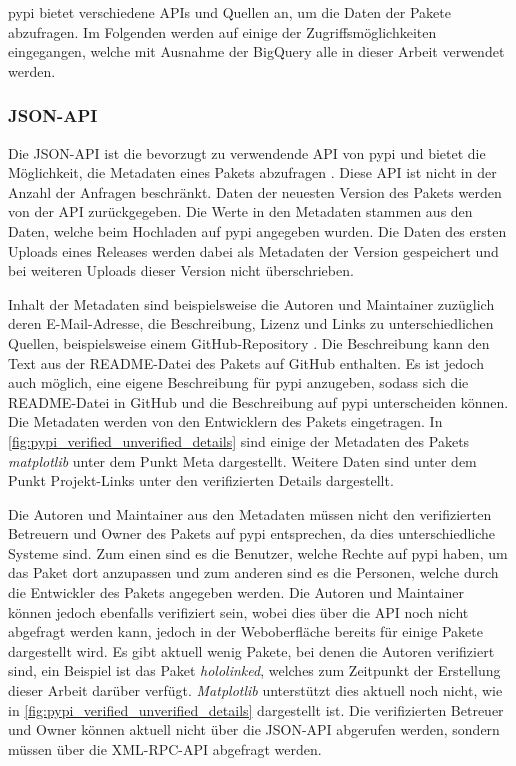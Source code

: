 \gls{pypi} bietet verschiedene APIs und Quellen an, um die Daten der Pakete abzufragen.
Im Folgenden werden auf einige der Zugriffsmöglichkeiten eingegangen, welche mit Ausnahme der BigQuery alle in dieser Arbeit verwendet werden.

\subsubsection*{JSON-API}
\label{subsubsec:pypi_json_api}
Die JSON-API ist die bevorzugt zu verwendende API von \gls{pypi} und bietet die Möglichkeit, die Metadaten eines Pakets abzufragen \autocite{python_software_foundation_warehouse_2024}.
Diese API ist nicht in der Anzahl der Anfragen beschränkt.
Daten der neuesten Version des Pakets werden von der API zurückgegeben.
Die Werte in den Metadaten stammen aus den Daten, welche beim Hochladen auf \gls{pypi} angegeben wurden.
Die Daten des ersten Uploads eines Releases werden dabei als Metadaten der Version gespeichert und bei weiteren Uploads dieser Version nicht überschrieben.

Inhalt der Metadaten sind beispielsweise die Autoren und Maintainer zuzüglich deren E-Mail-Adresse, die Beschreibung, Lizenz und Links zu unterschiedlichen Quellen, beispielsweise einem GitHub-Repository \autocite{python_software_foundation_warehouse_2024}.
Die Beschreibung kann den Text aus der README-Datei des Pakets auf GitHub enthalten.
Es ist jedoch auch möglich, eine eigene Beschreibung für \gls{pypi} anzugeben, sodass sich die README-Datei in GitHub und die Beschreibung auf \gls{pypi} unterscheiden können.
Die Metadaten werden von den Entwicklern des Pakets eingetragen.
In \autoref{fig:pypi_verified_unverified_details} sind einige der Metadaten des Pakets \emph{matplotlib} unter dem Punkt \glqq Meta\grqq{} dargestellt.
Weitere Daten sind unter dem Punkt \glqq Projekt-Links\grqq{} unter den verifizierten Details dargestellt.

Die Autoren und Maintainer aus den Metadaten müssen nicht den verifizierten Betreuern und Owner des Pakets auf \gls{pypi} entsprechen, da dies unterschiedliche Systeme sind.
Zum einen sind es die Benutzer, welche Rechte auf \gls{pypi} haben, um das Paket dort anzupassen und zum anderen sind es die Personen, welche durch die Entwickler des Pakets angegeben werden.
Die Autoren und Maintainer können jedoch ebenfalls verifiziert sein, wobei dies über die API noch nicht abgefragt werden kann, jedoch in der Weboberfläche bereits für einige Pakete dargestellt wird.
Es gibt aktuell wenig Pakete, bei denen die Autoren verifiziert sind, ein Beispiel ist das Paket \emph{hololinked}, welches zum Zeitpunkt der Erstellung dieser Arbeit darüber verfügt.
\emph{Matplotlib} unterstützt dies aktuell noch nicht, wie in \autoref{fig:pypi_verified_unverified_details} dargestellt ist.
Die verifizierten Betreuer und Owner können aktuell nicht über die JSON-API abgerufen werden, sondern müssen über die XML-RPC-API abgefragt werden.

